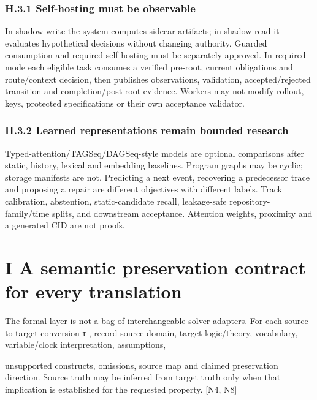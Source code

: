 \subsubsection*{H.3.1 Self-hosting must be observable}
In shadow-write the system computes sidecar artifacts; in shadow-read it evaluates hypothetical
decisions without changing authority. Guarded consumption and required self-hosting must be
separately approved. In required mode each eligible task consumes a verified pre-root, current
obligations and route/context decision, then publishes observations, validation, accepted/rejected
transition and completion/post-root evidence. Workers may not modify rollout, keys, protected
specifications or their own acceptance validator.

\subsubsection*{H.3.2 Learned representations remain bounded research}
Typed-attention/TAGSeq/DAGSeq-style models are optional comparisons after static, history, lexical
and embedding baselines. Program graphs may be cyclic; storage manifests are not. Predicting a next
event, recovering a predecessor trace and proposing a repair are different objectives with different
labels. Track calibration, abstention, static-candidate recall, leakage-safe repository-family/time
splits, and downstream acceptance. Attention weights, proximity and a generated CID are not proofs.

\section*{I A semantic preservation contract for every translation}
The formal layer is not a bag of interchangeable solver adapters. For each source-to-target conversion
τ , record source domain, target logic/theory, vocabulary, variable/clock interpretation, assumptions,


unsupported constructs, omissions, source map and claimed preservation direction. Source truth may
be inferred from target truth only when that implication is established for the requested property. [N4,
N8]

